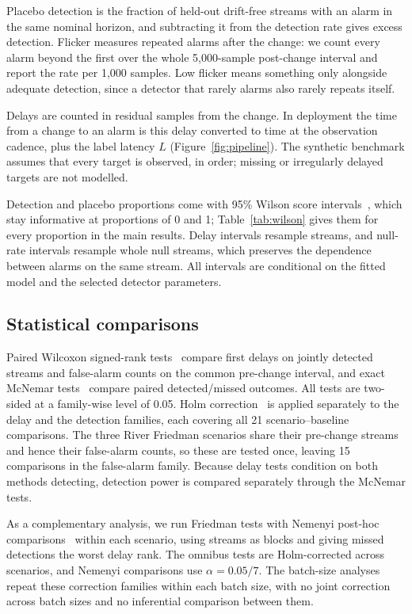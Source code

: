 \documentclass[preprint,12pt]{elsarticle}
\begin{document}
Placebo detection is the fraction of held-out drift-free streams with an alarm in the same nominal horizon, and subtracting it from the detection rate gives excess detection. Flicker measures repeated alarms after the change: we count every alarm beyond the first over the whole 5,000-sample post-change interval and report the rate per 1,000 samples. Low flicker means something only alongside adequate detection, since a detector that rarely alarms also rarely repeats itself.

Delays are counted in residual samples from the change. In deployment the time from a change to an alarm is this delay converted to time at the observation cadence, plus the label latency $L$ (Figure~\ref{fig:pipeline}). The synthetic benchmark assumes that every target is observed, in order; missing or irregularly delayed targets are not modelled.

Detection and placebo proportions come with 95\% Wilson score intervals~\cite{wilson1927probable}, which stay informative at proportions of 0 and 1; Table~\ref{tab:wilson} gives them for every proportion in the main results. Delay intervals resample streams, and null-rate intervals resample whole null streams, which preserves the dependence between alarms on the same stream. All intervals are conditional on the fitted model and the selected detector parameters.

\subsection{Statistical comparisons}
\label{sec:significance}
Paired Wilcoxon signed-rank tests~\cite{wilcoxon1945individual} compare first delays on jointly detected streams and false-alarm counts on the common pre-change interval, and exact McNemar tests~\cite{mcnemar1947note} compare paired detected/missed outcomes. All tests are two-sided at a family-wise level of 0.05. Holm correction~\cite{holm1979simple} is applied separately to the delay and the detection families, each covering all 21 scenario--baseline comparisons. The three River Friedman scenarios share their pre-change streams and hence their false-alarm counts, so these are tested once, leaving 15 comparisons in the false-alarm family. Because delay tests condition on both methods detecting, detection power is compared separately through the McNemar tests.

As a complementary analysis, we run Friedman tests with Nemenyi post-hoc comparisons~\cite{demvsar2006statistical} within each scenario, using streams as blocks and giving missed detections the worst delay rank. The omnibus tests are Holm-corrected across scenarios, and Nemenyi comparisons use $\alpha=0.05/7$. The batch-size analyses repeat these correction families within each batch size, with no joint correction across batch sizes and no inferential comparison between them.
\end{document}
